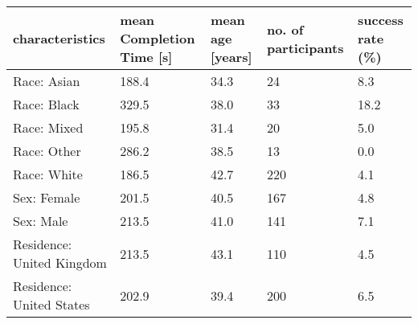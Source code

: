 \begin{tabular}{L{1.8in}|L{1.2in}|L{.8in}|L{.8in}|L{1.2in}}\hline
characteristics& mean  Completion  Time  [s] & mean  age  [years] & no.  of  participants & success  rate  (\%) \\\hline
 \rowcolor{\ACOL}Race:  Asian &188.4&34.3&24&8.3\\\hline
 \rowcolor{\ACOL}Race:  Black &329.5&38.0&33&18.2\\\hline
 \rowcolor{\ACOL}Race:  Mixed &195.8&31.4&20&5.0\\\hline
 \rowcolor{\ACOL}Race:  Other &286.2&38.5&13&0.0\\\hline
 \rowcolor{\ACOL}Race:  White &186.5&42.7&220&4.1\\\hline
 \rowcolor{\BCOL}Sex:  Female &201.5&40.5&167&4.8\\\hline
 \rowcolor{\BCOL}Sex:  Male &213.5&41.0&141&7.1\\\hline
 \rowcolor{\CCOL}Residence:  United  Kingdom &213.5&43.1&110&4.5\\\hline
 \rowcolor{\CCOL}Residence:  United  States &202.9&39.4&200&6.5\\\hline
\hline\end{tabular}
